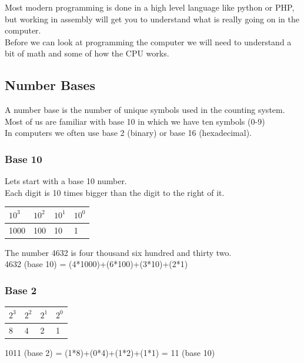 \documentclass{ol-softwaremanual}
\begin{document}
Most modern programming is done in a high level language like python or PHP, but working in assembly will get you to understand what is really going on in the computer.\\

Before we can look at programming the computer we will need to understand a bit of math and some of how the CPU works.\\

\pagebreak
\subsection{Number Bases}
A number base is the number of unique symbols used in the counting system. Most of us are familiar with base 10 in which we have ten symbols (0-9)
\\
In computers we often use base 2 (binary) or base 16 (hexadecimal).

\subsubsection{Base 10}
Lets start with a base 10 number.\\
Each digit is 10 times bigger than the digit to the right of it.\\

\begin{table}[h]
\begin{tabular}{llll}
$10^3$ & $10^2$ & $10^1$ & $10^0$ \\ \hline
1000 & 100 & 10 & 1                     \\
\end{tabular}
\end{table}
The number 4632 is four thousand six hundred and thirty two.\\
4632 (base 10) = (4*1000)+(6*100)+(3*10)+(2*1)

\subsubsection{Base 2}
\begin{table}[h]
\begin{tabular}{llll}
$2^3$ & $2^2$ & $2^1$ & $2^0$ \\ \hline
8 & 4 & 2 & 1                     \\
\end{tabular}
\end{table}
1011 (base 2) = (1*8)+(0*4)+(1*2)+(1*1) = 11 (base 10)
\end{document}
